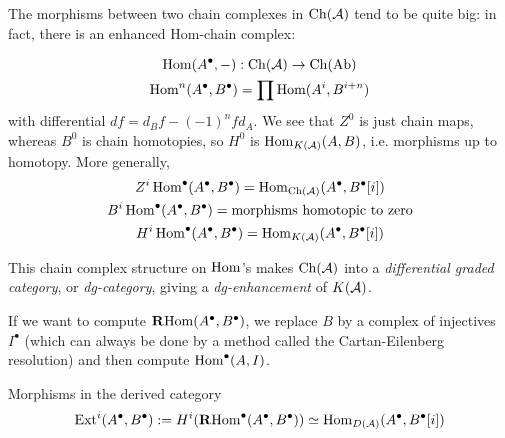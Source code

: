 The morphisms between two chain complexes in $\mathrm{Ch}(\mathcal{A})$ tend to be quite big: in fact, there is an enhanced Hom-chain complex:

\begin{gather*}
    \operatorname{Hom}(A^\bullet, -):\mathrm{Ch}(\mathcal{A})\rightarrow \mathrm{Ch}(\mathrm{Ab})\\
    \operatorname{Hom}^n(A^\bullet,B^\bullet) = \prod\operatorname{Hom}(A^i, B^{i+n})
\end{gather*}
with differential $df=d_Bf-(-1)^nfd_A$. We see that $Z^0$ is just chain maps, whereas $B^0$ is chain homotopies, so $H^0$ is $\operatorname{Hom}_{K(\mathcal{A})}(A,B)$, i.e. morphisms up to homotopy. More generally,
$$\begin{gathered}
    Z^i \operatorname{Hom}^\bullet(A^\bullet, B^\bullet)= \operatorname{Hom}_{\operatorname{Ch}(\mathcal{A})}(A^\bullet, B^\bullet[i])\\
    B^i \operatorname{Hom}^\bullet(A^\bullet, B^\bullet) = \text{morphisms homotopic to zero}\\
    H^i \operatorname{Hom}^\bullet(A^\bullet, B^\bullet)=\operatorname{Hom}_{K(\mathcal{A})}(A^\bullet, B^\bullet[i])
\end{gathered}$$

\begin{remark}{}{}
    This chain complex structure on $\operatorname{Hom}$'s makes $\operatorname{Ch}(\mathcal{A})$ into a
    \emph{differential graded category}, or \emph{dg-category}, giving a
    \emph{dg-enhancement} of $K(\mathcal{A})$.
\end{remark}

If we want to compute $\operatorname{\mathbf{R} Hom}(A^\bullet,B^\bullet)$, we replace $B$ by a complex of injectives $I^\bullet$ (which can always be done by a method called the Cartan-Eilenberg resolution) and then compute $\operatorname{Hom}^\bullet(A,I)$.

\begin{proposition}{Morphisms in the derived category}{}
    $$\operatorname{Ext}^i(A^\bullet, B^\bullet):=H^i(\operatorname{\mathbf{R} Hom}^\bullet(A^\bullet,B^\bullet))\simeq \operatorname{Hom}_{D(\mathcal{A})}(A^\bullet, B^\bullet[i])$$
\end{proposition}

